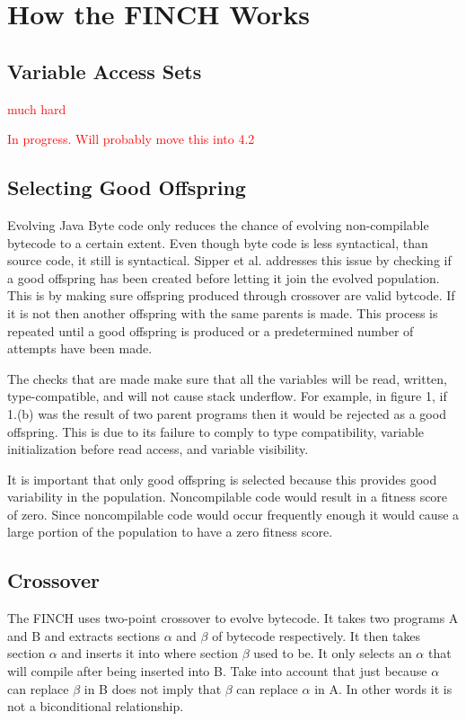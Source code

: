 \documentclass{sig-alternate}
\newcommand{\mycomment}[1]{\textcolor{red}{#1}}
\begin{document}
\section{How the FINCH Works}
\subsection{Variable Access Sets}
\cite{FINCH2:2009} \mycomment{much hard}\par
\mycomment{In progress. Will probably move this into 4.2}
\subsection{Selecting Good Offspring}
Evolving Java Byte code only reduces the chance of evolving non-compilable bytecode to a certain extent. Even though byte code is less syntactical, than source code, it still is syntactical. Sipper et al.\cite{FINCH2:2009} addresses this issue by checking if a good offspring has been created before letting it join the evolved population. This is by making sure offspring produced through crossover are valid bytcode. If it is not then another offspring with the same parents is made. This process is repeated until a good offspring is produced or a predetermined number of attempts have been made.\par
The checks that are made make sure that all the variables will be read, written, type-compatible, and will not cause stack underflow\cite{VIII:2011}. For example, in figure 1, if 1.(b) was the result of two parent programs then it would be rejected as a good offspring. This is due to its failure to comply to type compatibility, variable initialization before read access, and variable visibility.\par
It is important that only good offspring is selected because this provides good variability in the population. Noncompilable code would result in a fitness score of zero. Since noncompilable code would occur frequently enough it would cause a large portion of the population to have a zero fitness score.

\subsection{Crossover}


The FINCH uses two-point crossover to evolve bytecode. It takes two programs A and B and extracts sections $\alpha$ and $\beta$ of bytecode respectively. It then takes section $\alpha$ and inserts it into where section $\beta$ used to be. It only selects an $\alpha$ that will compile after being inserted into B. Take into account that just because $\alpha$ can replace $\beta$ in B does not imply that $\beta$ can replace $\alpha$ in A. In other words it is not a biconditional relationship.
\end{document}
